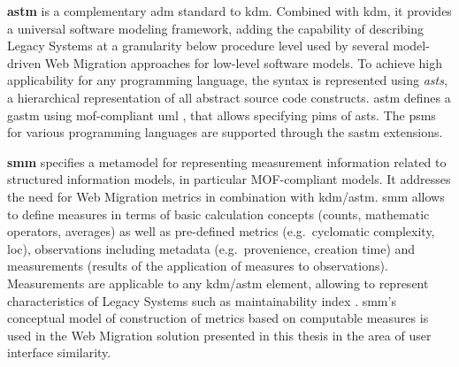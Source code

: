 \textbf{\gls{astm}} \autocite{OMG2011ASTM} is a complementary \gls{adm} standard to \gls{kdm}.
Combined with \gls{kdm}, it provides a universal software modeling framework, adding the capability of describing \glspl{Legacy System} at a granularity below procedure level used by several model-driven \gls{Web Migration} approaches for low-level software models.
To achieve high applicability for any programming language, the syntax is represented using \emph{\glspl{ast}}, a hierarchical representation of all abstract source code constructs.
\gls{astm} defines a \gls{gastm} using \gls{mof}-compliant \gls{uml} \autocite{OMG2017UML}, that allows specifying \glspl{pim} of \glspl{ast}.
The \glspl{psm} for various programming languages are supported through the \gls{sastm} extensions.

\textbf{\gls{smm}} \autocite{OMG2012SMM} specifies a \gls{metamodel} for representing measurement information related to structured information models, in particular MOF-compliant models.
It addresses the need for \gls{Web Migration} metrics in combination with \gls{kdm}/\gls{astm}.
\gls{smm} allows to define measures in terms of basic calculation concepts (counts, mathematic operators, averages) as well as pre-defined metrics (e.g.~cyclomatic complexity, \gls{loc}), observations including metadata (e.g.~provenience, creation time) and measurements (results of the application of measures to observations).
Measurements are applicable to any \gls{kdm}/\gls{astm} element, allowing to represent characteristics of \glspl{Legacy System} such as maintainability index \autocite{Coleman1994MaintainabilityIndex}.
\gls{smm}'s conceptual model of construction of metrics based on computable measures is used in the \gls{Web Migration} solution presented in this thesis in the area of user interface similarity.

